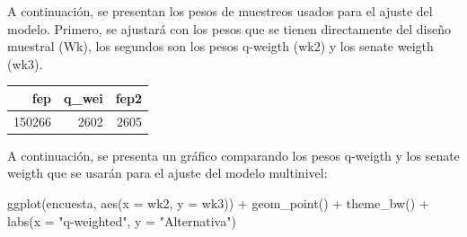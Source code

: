 \documentclass[
  12pt,
]{book}
\newenvironment{Shaded}{\begin{snugshade}}{\end{snugshade}}
\newcommand{\AttributeTok}[1]{\textcolor[rgb]{0.77,0.63,0.00}{#1}}
\newcommand{\FunctionTok}[1]{\textcolor[rgb]{0.00,0.00,0.00}{#1}}
\newcommand{\NormalTok}[1]{#1}
\newcommand{\OtherTok}[1]{\textcolor[rgb]{0.56,0.35,0.01}{#1}}
\newcommand{\SpecialCharTok}[1]{\textcolor[rgb]{0.00,0.00,0.00}{#1}}
\newcommand{\StringTok}[1]{\textcolor[rgb]{0.31,0.60,0.02}{#1}}
\begin{document}
A continuación, se presentan los pesos de muestreos usados para el ajuste del modelo. Primero, se ajustará con los pesos que se tienen directamente del diseño muestral (Wk), los segundos son los pesos q-weigth (wk2) y los senate weigth (wk3).

\begin{Shaded}
\end{Shaded}

\begin{tabular}{r|r|r}
\hline
fep & q\_wei & fep2\\
\hline
150266 & 2602 & 2605\\
\hline
\end{tabular}

A continuación, se presenta un gráfico comparando los pesos q-weigth y los senate weigth que se usarán para el ajuste del modelo multinivel:

\begin{Shaded}
\begin{Highlighting}[]
\FunctionTok{ggplot}\NormalTok{(encuesta, }\FunctionTok{aes}\NormalTok{(}\AttributeTok{x =}\NormalTok{ wk2, }\AttributeTok{y =}\NormalTok{ wk3)) }\SpecialCharTok{+} 
  \FunctionTok{geom\_point}\NormalTok{() }\SpecialCharTok{+} \FunctionTok{theme\_bw}\NormalTok{() }\SpecialCharTok{+} 
  \FunctionTok{labs}\NormalTok{(}\AttributeTok{x =} \StringTok{"q{-}weighted"}\NormalTok{, }\AttributeTok{y =} \StringTok{"Alternativa"}\NormalTok{)}
\end{Highlighting}
\end{Shaded}
\end{document}
